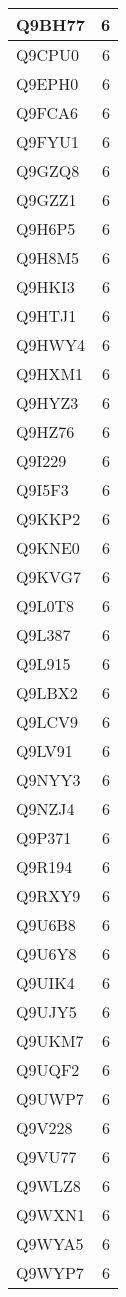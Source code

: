 \documentclass[
]{book}
\theoremstyle{definition}
\theoremstyle{definition}
\theoremstyle{definition}
\theoremstyle{definition}
\theoremstyle{remark}
\begin{document}
\begin{table}
\begin{tabular}{l|r}
\hline
Q9BH77 & 6\\
\hline
Q9CPU0 & 6\\
\hline
Q9EPH0 & 6\\
\hline
Q9FCA6 & 6\\
\hline
Q9FYU1 & 6\\
\hline
Q9GZQ8 & 6\\
\hline
Q9GZZ1 & 6\\
\hline
Q9H6P5 & 6\\
\hline
Q9H8M5 & 6\\
\hline
Q9HKI3 & 6\\
\hline
Q9HTJ1 & 6\\
\hline
Q9HWY4 & 6\\
\hline
Q9HXM1 & 6\\
\hline
Q9HYZ3 & 6\\
\hline
Q9HZ76 & 6\\
\hline
Q9I229 & 6\\
\hline
Q9I5F3 & 6\\
\hline
Q9KKP2 & 6\\
\hline
Q9KNE0 & 6\\
\hline
Q9KVG7 & 6\\
\hline
Q9L0T8 & 6\\
\hline
Q9L387 & 6\\
\hline
Q9L915 & 6\\
\hline
Q9LBX2 & 6\\
\hline
Q9LCV9 & 6\\
\hline
Q9LV91 & 6\\
\hline
Q9NYY3 & 6\\
\hline
Q9NZJ4 & 6\\
\hline
Q9P371 & 6\\
\hline
Q9R194 & 6\\
\hline
Q9RXY9 & 6\\
\hline
Q9U6B8 & 6\\
\hline
Q9U6Y8 & 6\\
\hline
Q9UIK4 & 6\\
\hline
Q9UJY5 & 6\\
\hline
Q9UKM7 & 6\\
\hline
Q9UQF2 & 6\\
\hline
Q9UWP7 & 6\\
\hline
Q9V228 & 6\\
\hline
Q9VU77 & 6\\
\hline
Q9WLZ8 & 6\\
\hline
Q9WXN1 & 6\\
\hline
Q9WYA5 & 6\\
\hline
Q9WYP7 & 6\\

\end{tabular}
\end{table}
\end{document}
